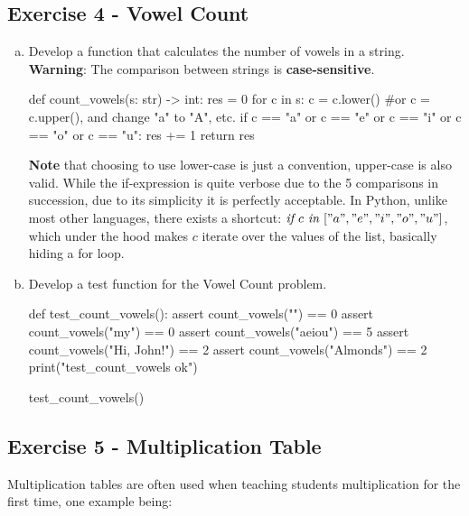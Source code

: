 \documentclass[12pt]{article}
\begin{document}
\subsection*{Exercise 4 - Vowel Count}
\begin{enumerate}[a)]
  \item Develop a function that calculates the number of vowels in a string.
    \textbf{Warning}: The comparison between strings is \textbf{case-sensitive}.
\begin{pythonlst}
def count_vowels(s: str) -> int:
  res = 0
  for c in s:
    c = c.lower() #or c = c.upper(), and change "a" to "A", etc.
    if c == "a" or c == "e" or c == "i" or c == "o" or c == "u":
      res += 1
  return res
\end{pythonlst}
\textbf{Note} that choosing to use lower-case is just a convention, upper-case
is also valid. While the if-expression is quite verbose due to the 5 comparisons 
in succession, due to its simplicity it is perfectly acceptable. In Python,
unlike most other languages, there exists a shortcut:
$\textit{if } c \textit{ in } ["a", "e", "i", "o", "u"]$, which under the hood
makes $c$ iterate over the values of the list, basically hiding a for loop.

  \item Develop a test function for the Vowel Count problem.
\newpage
\begin{pythonlst}
def test_count_vowels():
  assert count_vowels("") == 0
  assert count_vowels("my") == 0
  assert count_vowels("aeiou") == 5
  assert count_vowels("Hi, John!") == 2
  assert count_vowels("Almonds") == 2
  print("test_count_vowels ok")

test_count_vowels()
\end{pythonlst}
\end{enumerate}

\subsection*{Exercise 5 - Multiplication Table}
Multiplication tables are often used when teaching students multiplication for
the first time, one example being:
\end{document}
